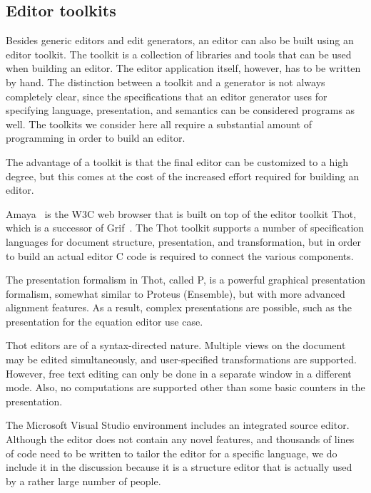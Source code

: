 \documentclass{speauth}
\begin{document}
%																
\subsection {Editor toolkits} \label{sect:toolkits}

Besides generic editors and edit generators, an editor can also be built using an editor toolkit. The toolkit is a collection of libraries and tools that can be used when building an editor. The editor application itself, however, has to be written by hand. The distinction between a toolkit and a generator is not always completely clear, since the specifications that an editor generator uses for specifying language, presentation, and semantics can be considered programs as well. The toolkits we consider here all require a substantial amount of programming in order to build an editor.

The advantage of a toolkit is that the final editor can be customized to a high degree, but this comes at the cost of the increased effort required for building an editor. 


Amaya~\cite{amaya04} is the W3C web browser that is built on top of the editor toolkit Thot\cite{quint97thot}, which is a successor of Grif~\cite{quint86grif}. The Thot toolkit supports a number of specification languages for document structure, presentation, and transformation, but in order to build an actual editor C code is required to connect the various components.

The presentation formalism in Thot, called P, is a powerful graphical presentation formalism, somewhat similar to Proteus (Ensemble), but with more advanced alignment features. As a result, complex presentations are possible, such as the presentation for the equation editor use case.

Thot editors are of a syntax-directed nature. Multiple views on the document may be edited simultaneously, and user-specified transformations are supported. However, free text editing can only be done in a separate window in a different mode. Also, no computations are supported other than some basic counters in the presentation. 

%
%


The Microsoft Visual Studio environment includes an integrated source editor. Although the editor does not contain any novel features, and thousands of lines of code need to be written to tailor the editor for a specific language, we do include it in the discussion because it is a structure editor that is actually used by a rather large number of people. 
\end{document}
